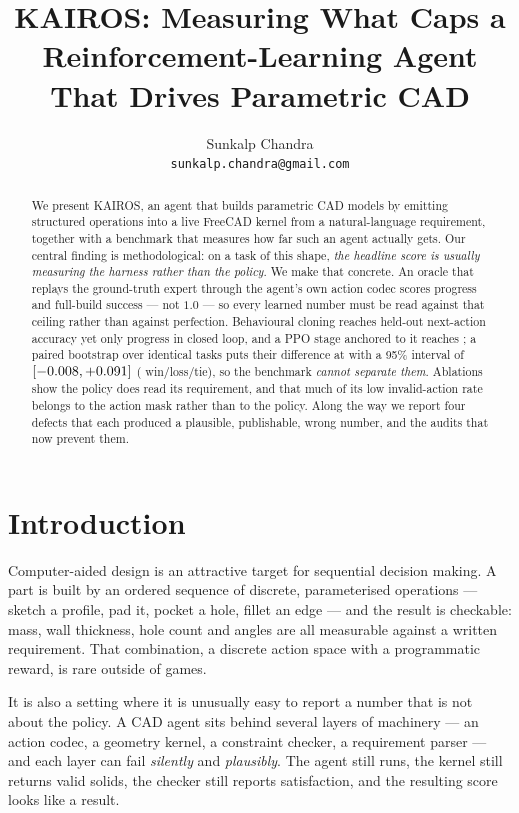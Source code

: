 \documentclass{article}
\title{KAIROS: Measuring What Caps a Reinforcement-Learning Agent\\
       That Drives Parametric CAD}
\author{%
  Sunkalp Chandra \\
  \texttt{sunkalp.chandra@gmail.com} \\
}
\begin{document}
\maketitle

\begin{abstract}
We present KAIROS, an agent that builds parametric CAD models by emitting
structured operations into a live FreeCAD kernel from a natural-language
requirement, together with a benchmark that measures how far such an agent
actually gets. Our central finding is methodological: on a task of this shape,
\emph{the headline score is usually measuring the harness rather than the
policy}. We make that concrete. An oracle that replays the ground-truth expert
through the agent's own action codec scores \OracleCeiling{} progress and
\OracleSuccess{} full-build success --- not $1.0$ --- so every learned number
must be read against that ceiling rather than against perfection. Behavioural
cloning reaches \BCHeldOutAccuracy{} held-out next-action accuracy yet only
\BCProgress{} progress in closed loop, and a PPO stage anchored to it reaches
\PPOProgress{}; a paired bootstrap over identical tasks puts their difference at
\BCvsPPODelta{} with a 95\% interval of $[-0.008, +0.091]$
(\BCvsPPOWLT{} win/loss/tie), so the benchmark \emph{cannot separate them}.
Ablations show the policy does read its requirement, and that much of its low
invalid-action rate belongs to the action mask rather than to the policy.
Along the way we report four defects that each produced a plausible, publishable,
wrong number, and the audits that now prevent them.
\end{abstract}

\section{Introduction}

Computer-aided design is an attractive target for sequential decision making. A
part is built by an ordered sequence of discrete, parameterised operations ---
sketch a profile, pad it, pocket a hole, fillet an edge --- and the result is
checkable: mass, wall thickness, hole count and angles are all measurable
against a written requirement. That combination, a discrete action space with a
programmatic reward, is rare outside of games.

It is also a setting where it is unusually easy to report a number that is not
about the policy. A CAD agent sits behind several layers of machinery --- an
action codec, a geometry kernel, a constraint checker, a requirement parser ---
and each layer can fail \emph{silently} and \emph{plausibly}. The agent still
runs, the kernel still returns valid solids, the checker still reports
satisfaction, and the resulting score looks like a result.
\end{document}
